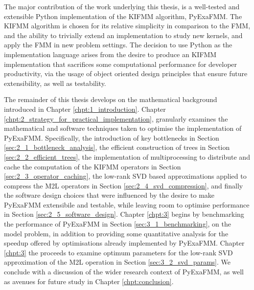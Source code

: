 The major contribution of the work underlying this thesis, is a well-tested and
extensible Python implementation of the \gls{KIFMM} algorithm, \gls{PyExaFMM}. The \gls{KIFMM}
algorithm is chosen for its relative simplicity in comparison to the \gls{FMM},
and the ability to trivially extend an implementation to study new kernels, and
apply the \gls{FMM} in new problem settings. The decision to use Python as the implementation language arises from the desire
to produce an \gls{KIFMM} implementation that sacrifices some computational
performance for developer productivity, via the usage of object oriented design
principles that ensure future extensibility, as well as testability.

The remainder of this thesis develops on the mathematical background introduced in Chapter \ref{chpt:1_introduction}.
Chapter \ref{chpt:2_strategy_for_practical_implementation}, granularly examines
the mathematical and software techniques taken to optimise the implementation of
\gls{PyExaFMM}. Specifically, the introduction of key bottlenecks in Section \ref{sec:2_1_bottleneck_analysis},
the efficient construction of trees in Section \ref{sec:2_2_efficient_trees}, the implementation
of multiprocessing to distribute and cache the computation of the \gls{KIFMM}
operators in Section \ref{sec:2_3_operator_caching}, the low-rank SVD based
approximations applied to compress the \gls{M2L} operators in Section \ref{sec:2_4_svd_compression},
and finally the software design choices that were influenced by the desire to
make \gls{PyExaFMM} extensibile and testable, while leaving room to optimise
performance in Section \ref{sec:2_5_software_design}. Chapter \ref{chpt:3} begins
by benchmarking the performance of \gls{PyExaFMM} in Section \ref{sec:3_1_benchmarking},
on the model problem, in addition to providing some quantitative analysis
for the speedup offered by optimisations already implemented by \gls{PyExaFMM}.
Chapter \ref{chpt:3} the proceeds to examine optimum parameters for the
low-rank SVD approximation of the \gls{M2L} operation in Section \ref{sec:3_2_svd_params}.
We conclude with a discussion of the wider research context of \gls{PyExaFMM},
as well as avenues for future study in Chapter \ref{chpt:conclusion}.
